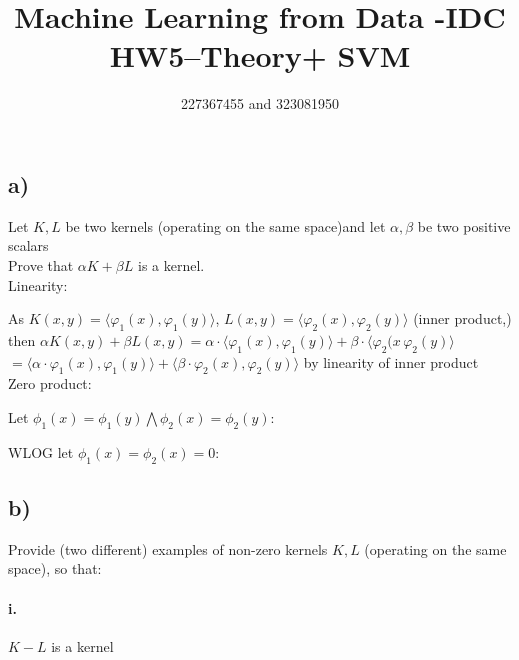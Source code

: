 \documentclass[12pt]{article}
\title{Machine Learning from Data -IDC\\HW5–Theory+ SVM}
\author{227367455 and 323081950}
\newcommand\tab[1][1cm]{\hspace*{#1}}
\begin{document}
\maketitle

\section*{}

\subsection*{a)}

Let $K,L$ be two kernels (operating on the same space)and let $ \alpha, \beta $ be two positive scalars \\
\tab Prove that $\alpha K + \beta L $ is a kernel.\\

\tab Linearity:

As $K(x,y) = \langle\varphi_{1}(x), \varphi_{1}(y)\rangle$, $L(x,y) = \langle\varphi_{2}(x), \varphi_{2}(y)\rangle$ (inner product,) \\
		then $\alpha K(x,y) + \beta L(x,y) = \alpha \cdot \langle \varphi_{1}(x),\varphi_{1}(y)\rangle + \beta \cdot \langle\varphi_{2}(x\,\varphi_{2}(y)\rangle $ \\
		$ = \langle \alpha \cdot \varphi_{1}(x),\varphi_{1}(y)\rangle + \langle\beta \cdot\varphi_{2}(x),\varphi_{2}(y)\rangle $ by linearity of inner product\\
		
\tab Zero product:

Let $\phi_1(x) =  \phi_1(y) \bigwedge \phi_2(x) =  \phi_2(y)$: 


WLOG let $ \phi_1(x) =  \phi_2(x) = 0 $:
		
\subsection*{b)}

Provide (two different) examples of non-zero kernels $K,L$ (operating on the same space), so that:

\paragraph{\tab i.}

$K - L$ is a kernel
\end{document}

